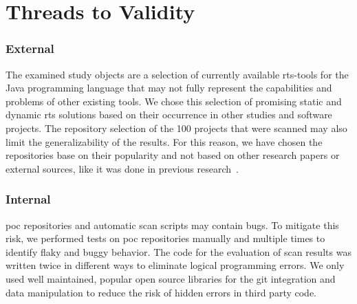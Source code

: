 \section{Threads to Validity}

\subsubsection{External}
The examined study objects are a selection of currently available \ac{rts}-tools for the Java
programming language that may not fully represent the capabilities and problems of other existing
tools. We chose this selection of promising static and dynamic \ac{rts} solutions based on their
occurrence in other studies and software projects. The repository selection of the 100 projects 
that were scanned may also limit the generalizability of the results. For this reason, we have chosen the
repositories base on their popularity and not based on other research papers or external sources,
like it was done in previous research~\cite{ekstazimain,hyrts_paper,starts_paper}. 

\subsubsection{Internal}
\ac{poc} repositories and automatic scan scripts may contain bugs. To mitigate this risk, we
performed tests on \ac{poc} repositories manually and multiple times to identify flaky and buggy behavior.
The code for the evaluation of scan results was written twice in different ways to eliminate logical
programming errors. We only used well maintained, popular open source libraries for the git integration
and data manipulation to reduce the risk of hidden errors in third party code.
